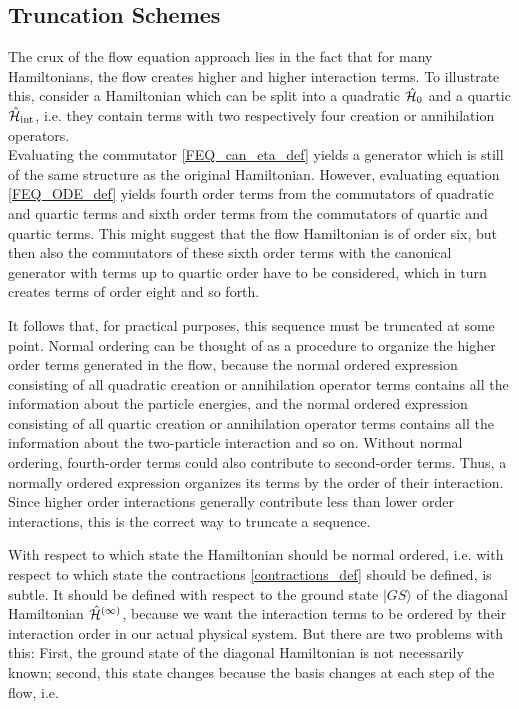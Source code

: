 \subsection{Truncation Schemes}\label{Truncation Schemes}
The crux of the flow equation approach lies in the fact that for many Hamiltonians, the flow creates higher and higher interaction terms. To illustrate this, consider a Hamiltonian which can be split into a quadratic $\hat{\mathcal{H}}_0$ and a quartic $\hat{\mathcal{H}}_{\mathrm{int}}$, i.e. they contain terms with two respectively four creation or annihilation operators. \\
Evaluating the commutator \ref{FEQ_can_eta_def} yields a generator which is still of the same structure as the original Hamiltonian. However, evaluating equation \ref{FEQ_ODE_def}  yields fourth order terms from the commutators of quadratic and quartic terms and sixth order terms from the commutators of quartic and quartic terms. This might suggest that the flow Hamiltonian is of order six, but then also the commutators of these sixth order terms with the canonical generator with terms up to quartic order have to be considered, which in turn creates terms of order eight and so forth. \par
It follows that, for practical purposes, this sequence must be truncated at some point. Normal ordering can be thought of as a procedure to organize the higher order terms generated in the flow, because the normal ordered expression consisting of all quadratic creation or annihilation operator terms contains all the information about the particle energies, and the normal ordered expression consisting of all quartic creation or annihilation operator terms contains all the information about the two-particle interaction and so on. Without normal ordering, fourth-order terms could also contribute to second-order terms. Thus, a normally ordered expression organizes its terms by the order of their interaction. Since higher order interactions generally contribute less than lower order interactions, this is the correct way to truncate a sequence. \par
With respect to which state the Hamiltonian should be normal ordered, i.e. with respect to which state the contractions \ref{contractions_def} should be defined, is subtle. It should be defined with respect to the ground state $|GS\rangle$ of the diagonal Hamiltonian $\hat{\mathcal{H}}^{(\infty)}$, because we want the interaction terms to be ordered by their interaction order in our actual physical system. But there are two problems with this: First, the ground state of the diagonal Hamiltonian is not necessarily known; second, this state changes because the basis changes at each step of the flow, i.e. 
